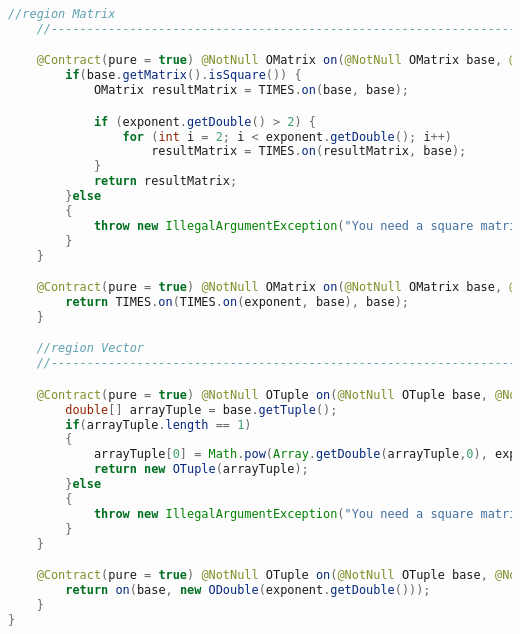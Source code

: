 \begin{lstlisting}[caption=Power (Istogu),label=list:Power,language=Java]
    //region Matrix
    //------------------------------------------------------------------------------------

    @Contract(pure = true) @NotNull OMatrix on(@NotNull OMatrix base, @NotNull ODouble exponent) {
        if(base.getMatrix().isSquare()) {
            OMatrix resultMatrix = TIMES.on(base, base);

            if (exponent.getDouble() > 2) {
                for (int i = 2; i < exponent.getDouble(); i++)
                    resultMatrix = TIMES.on(resultMatrix, base);
            }
            return resultMatrix;
        }else
        {
            throw new IllegalArgumentException("You need a square matrix for power operation.");
        }
    }

    @Contract(pure = true) @NotNull OMatrix on(@NotNull OMatrix base, @NotNull OFraction exponent){
        return TIMES.on(TIMES.on(exponent, base), base);
    }

    //region Vector
    //------------------------------------------------------------------------------------

    @Contract(pure = true) @NotNull OTuple on(@NotNull OTuple base, @NotNull ODouble exponent) {
        double[] arrayTuple = base.getTuple();
        if(arrayTuple.length == 1)
        {
            arrayTuple[0] = Math.pow(Array.getDouble(arrayTuple,0), exponent.getDouble());
            return new OTuple(arrayTuple);
        }else
        {
            throw new IllegalArgumentException("You need a square matrix for power operation.");
        }
    }

    @Contract(pure = true) @NotNull OTuple on(@NotNull OTuple base, @NotNull OFraction exponent) {
        return on(base, new ODouble(exponent.getDouble()));
    }
}
\end{lstlisting}    


